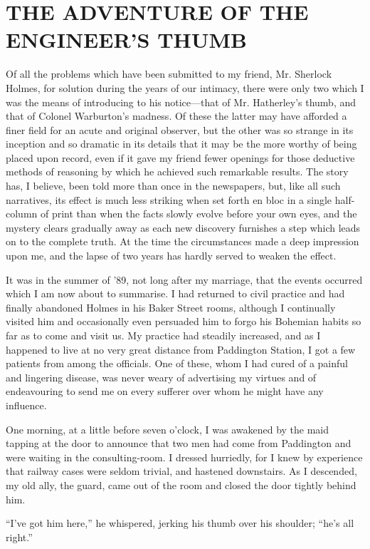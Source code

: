 \documentclass{article}
\begin{document}
\section*{THE ADVENTURE OF THE ENGINEER'S THUMB}

Of all the problems which have been submitted to my friend, Mr. Sherlock
Holmes, for solution during the years of our intimacy, there were only two
which I was the means of introducing to his notice---that of Mr. Hatherley's
thumb, and that of Colonel Warburton's madness. Of these the latter
may have afforded a finer field for an acute and original observer,
but the other was so strange in its inception and so dramatic in its
details that it may be the more worthy of being placed upon record,
even if it gave my friend fewer openings for those deductive methods of
reasoning by which he achieved such remarkable results. The story has,
I believe, been told more than once in the newspapers, but, like all
such narratives, its effect is much less striking when set forth en
bloc in a single half-column of print than when the facts slowly evolve
before your own eyes, and the mystery clears gradually away as each new
discovery furnishes a step which leads on to the complete truth. At the
time the circumstances made a deep impression upon me, and the lapse of
two years has hardly served to weaken the effect.

It was in the summer of '89, not long after my marriage, that the events
occurred which I am now about to summarise. I had returned to civil
practice and had finally abandoned Holmes in his Baker Street rooms,
although I continually visited him and occasionally even persuaded
him to forgo his Bohemian habits so far as to come and visit us. My
practice had steadily increased, and as I happened to live at no very
great distance from Paddington Station, I got a few patients from among
the officials. One of these, whom I had cured of a painful and lingering
disease, was never weary of advertising my virtues and of endeavouring
to send me on every sufferer over whom he might have any influence.

One morning, at a little before seven o'clock, I was awakened by the maid
tapping at the door to announce that two men had come from Paddington
and were waiting in the consulting-room. I dressed hurriedly, for I
knew by experience that railway cases were seldom trivial, and hastened
downstairs. As I descended, my old ally, the guard, came out of the room
and closed the door tightly behind him.

``I've got him here,'' he whispered, jerking his thumb over his shoulder;
``he's all right.''
\end{document}
